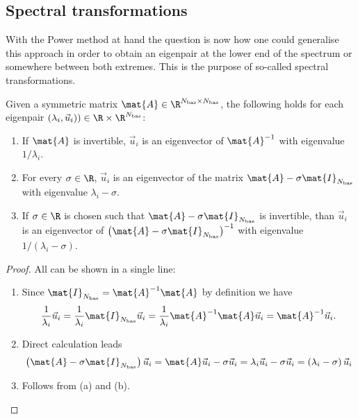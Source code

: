 
\subsection{Spectral transformations}
\label{sec:ShiftInvert}
With the Power method at hand the question is now how one could
generalise this approach in order to obtain an eigenpair at the lower end of the
spectrum or somewhere between both extremes.
This is the purpose of so-called spectral transformations.

\begin{prop}
	\label{prop:Spectral}
	Given a symmetric matrix $\mat{A} \in \R^{\Nbas \times \Nbas}$,
	the following holds for each eigenpair
	$(\lambda_i, \vec{u}_i)) \in \R \times \R^{\Nbas}$:
	\begin{enumerate}[label=(\alph*)]
		\item If $\mat{A}$ is invertible,
			$\vec{u}_i$ is an eigenvector of $\mat{A}^{-1}$ with eigenvalue
			$1 / \lambda_i$.
		\item For every $\sigma \in \R$, $\vec{u}_i$ is an eigenvector
			of the matrix $\mat{A} - \sigma \mat{I}_{\Nbas}$
			with eigenvalue $\lambda_i - \sigma$.
		\item If $\sigma \in \R$ is chosen such that
			$\mat{A} - \sigma \mat{I}_{\Nbas}$
			is invertible, than  $\vec{u}_i$ is an eigenvector
			of $\left( \mat{A} - \sigma \mat{I}_{\Nbas} \right)^{-1}$
			with eigenvalue $1 / (\lambda_i - \sigma)$.
	\end{enumerate}
	\begin{proof}
		All can be shown in a single line:
		\begin{enumerate}[label=(\alph*)]
			\item Since $\mat{I}_{\Nbas} = \mat{A}^{-1} \mat{A}$
				by definition we have
				\[ \frac{1}{\lambda_i} \vec{u}_i
					= \frac{1}{\lambda_i} \mat{I}_{\Nbas} \vec{u}_i
					= \frac{1}{\lambda_i} \mat{A}^{-1} \mat{A} \vec{u}_i
					= \mat{A}^{-1} \vec{u}_i.
				\]
			\item Direct calculation leads
				\[ \left( \mat{A} - \sigma \mat{I}_{\Nbas} \right) \vec{u}_i
					= \mat{A} \vec{u}_i - \sigma \vec{u}_i
					= \lambda_i \vec{u}_i - \sigma \vec{u}_i
					= \left( \lambda_i - \sigma  \right) \vec{u}_i
				\]
			\item Follows from (a) and (b).
		\end{enumerate}
	\end{proof}
\end{prop}

